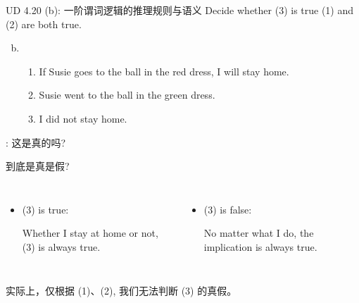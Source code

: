 \begin{frame}{}
  \begin{exampleblock}{UD 4.20 (b): 一阶谓词逻辑的推理规则与语义}
    Decide whether (3) is true  (1) and (2) are both true.

    \begin{enumerate}[(a)]
      \setcounter{enumi}{1}
      \item 
	\begin{enumerate}[(1)]
	  \item If Susie goes to the ball in the red dress, I will stay home.
	  \item Susie went to the ball in the green dress.
	  \item I did not stay home.
	\end{enumerate}
    \end{enumerate}
  \end{exampleblock}

  \begin{center}
    {: 这是真的吗?}
  \end{center}

  \pause
  \vspace{0.30cm}
  到底是真是假?
  \vspace{0.30cm}
  \begin{columns}
      \begin{itemize}
	\item (3) is true:

	Whether I stay at home or not, (3) is always true.
      \end{itemize}
      \begin{itemize}
        \item (3) is false:

	No matter what I do, the implication is always true.
      \end{itemize}
  \end{columns}

  \pause
  \vspace{0.50cm}
  \centerline{实际上，仅根据 (1)、(2), 我们无法判断 (3) 的真假。}
\end{frame}

